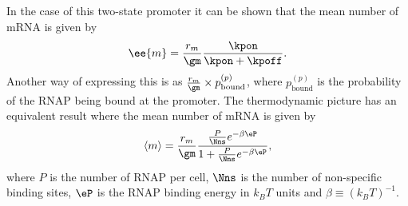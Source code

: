 In the case of this two-state promoter it can be shown that the mean number of
mRNA is given by \cite{Phillips2015} 
\begin{equation}
  \ee{m} = {r_m \over \gm} {\kpon \over \kpon + \kpoff}.
  \label{seq_mean_kinetic}
\end{equation}
Another way of expressing this is as ${r_m \over \gm} \times
p_{\text{bound}}^{(p)}$, where $p_{\text{bound}}^{(p)}$ is the probability of
the RNAP being bound at the promoter. The thermodynamic picture has an
equivalent result where the mean number of mRNA is given by \cite{Brewster2012,
Bintu2005a}
\begin{equation}
  \left\langle m \right\rangle = {r_m \over \gm}
  {{P \over \Nns} e^{-\beta\eP}
  \over 1 + {P \over \Nns} e^{-\beta\eP}},
  \label{seq_mean_thermo}
\end{equation}
where $P$ is the number of RNAP
per cell, $\Nns$ is the number of non-specific binding sites,
$\eP$ is the RNAP binding energy in $k_BT$ units and
$\beta\equiv {(k_BT)}^{-1}$.

